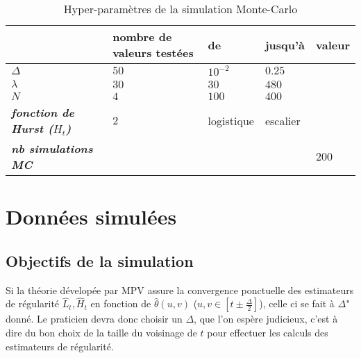 \begin{table}[]
    \begin{tabular}{l|l|ll|l|}
    \cline{2-5}
    \textbf{}                                                         & \textbf{nombre de valeurs testées} & \multicolumn{1}{l|}{\textbf{de}} & \textbf{jusqu'à}         & \textbf{valeur}          \\ \hline
    \multicolumn{1}{|l|}{\textit{\textbf{$\Delta$}}}                  & $50$                               & $10^{-2}$                        & $0.25$                   & \cellcolor[HTML]{C0C0C0} \\
    \multicolumn{1}{|l|}{\textit{\textbf{$\lambda$}}}                 & $30$                               & $30$                             & $480$                    & \cellcolor[HTML]{C0C0C0} \\
    \multicolumn{1}{|l|}{\textit{\textbf{$N$}}}                       & $4$                                & $100$                            & $400$                    & \cellcolor[HTML]{C0C0C0} \\
    \multicolumn{1}{|l|}{\textit{\textbf{fonction de Hurst ($H_t$)}}} & $2$                                & logistique                       & escalier                 & \cellcolor[HTML]{C0C0C0} \\
    \multicolumn{1}{|l|}{\textit{\textbf{nb simulations MC}}}         & \cellcolor[HTML]{C0C0C0}           & \cellcolor[HTML]{C0C0C0}         & \cellcolor[HTML]{C0C0C0} & $200$                    \\ \hline
    \end{tabular}
    \caption{Hyper-paramètres de la simulation Monte-Carlo}
    \label{tab:hyperparam-mc}
    \end{table}
\section{Données simulées}


\subsection{Objectifs de la simulation}


Si la théorie dévelopée par MPV assure la convergence ponctuelle des estimateurs de régularité $\hat L_t, \hat H_t$ en fonction de $\hat \theta(u,v)$ ($u,v \in [t \pm \frac \Delta 2 ]$), celle ci se fait à $\Delta$" donné. Le praticien devra donc choisir un $\Delta$, que l'on espère judicieux, c'est à dire du bon choix de la taille du voisinage de $t$ pour effectuer les calculs des estimateurs de régularité.

